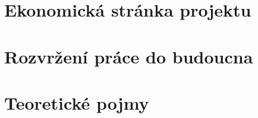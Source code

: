 \newpage
\chapter{Ekonomická stránka projektu}\label{ch:ekonomicka-stranka-projektu}
\textcolor{\textcolorname}{}

\newpage
\chapter{Rozvržení práce do budoucna}\label{ch:rozvrzeni-prace-do-budoucna}
\textcolor{\textcolorname}{}

\newpage
\chapter{Teoretické pojmy}\label{ch:teoreticke-pojmy}
\textcolor{\textcolorname}{}






